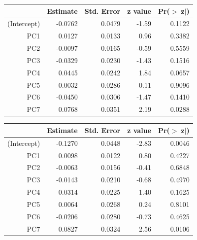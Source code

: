 \documentclass[a4paper,12pt]{Latex/Classes/PhDthesisPSnPDF}
\begin{document}
\begin{center}
\begin{table}[ht]
\centering
\begin{tabular}{rrrrr}
  \hline
 & Estimate & Std. Error & z value & Pr($>$$|$z$|$) \\ 
  \hline
(Intercept) & -0.0762 & 0.0479 & -1.59 & 0.1122 \\ 
  PC1 & 0.0127 & 0.0133 & 0.96 & 0.3382 \\ 
  PC2 & -0.0097 & 0.0165 & -0.59 & 0.5559 \\ 
  PC3 & -0.0329 & 0.0230 & -1.43 & 0.1516 \\ 
  PC4 & 0.0445 & 0.0242 & 1.84 & 0.0657 \\ 
  PC5 & 0.0032 & 0.0286 & 0.11 & 0.9096 \\ 
  PC6 & -0.0450 & 0.0306 & -1.47 & 0.1410 \\ 
  PC7 & 0.0768 & 0.0351 & 2.19 & 0.0288 \\ 
   \hline
\end{tabular}
\end{table}\end{center}
\newpage
\begin{center}
\begin{table}[ht]
\centering
\begin{tabular}{rrrrr}
  \hline
 & Estimate & Std. Error & z value & Pr($>$$|$z$|$) \\ 
  \hline
(Intercept) & -0.1270 & 0.0448 & -2.83 & 0.0046 \\ 
  PC1 & 0.0098 & 0.0122 & 0.80 & 0.4227 \\ 
  PC2 & -0.0063 & 0.0156 & -0.41 & 0.6848 \\ 
  PC3 & -0.0143 & 0.0210 & -0.68 & 0.4970 \\ 
  PC4 & 0.0314 & 0.0225 & 1.40 & 0.1625 \\ 
  PC5 & 0.0064 & 0.0268 & 0.24 & 0.8101 \\ 
  PC6 & -0.0206 & 0.0280 & -0.73 & 0.4625 \\ 
  PC7 & 0.0827 & 0.0324 & 2.56 & 0.0106 \\ 
   \hline
\end{tabular}
\end{table}\end{center}
\end{document}
